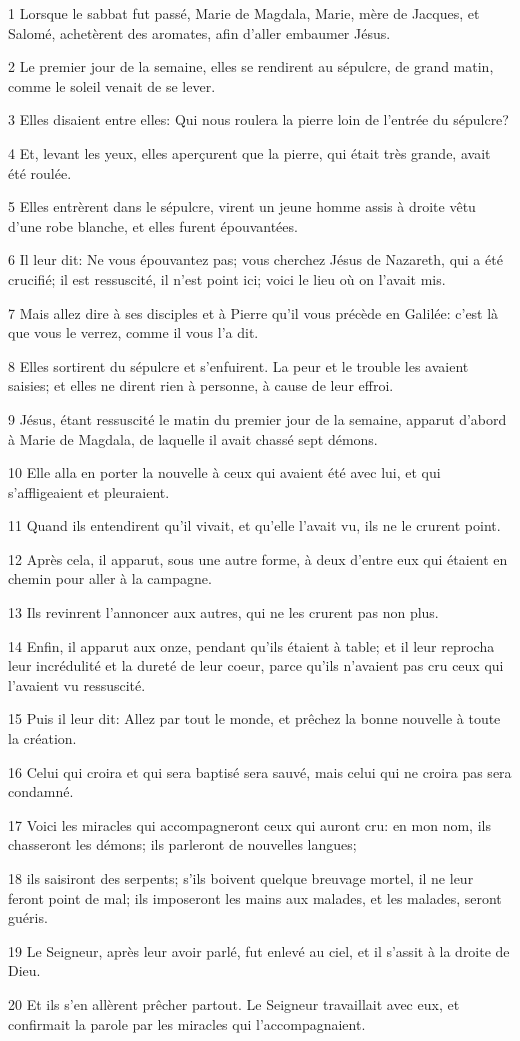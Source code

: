 \par 1 Lorsque le sabbat fut passé, Marie de Magdala, Marie, mère de Jacques, et Salomé, achetèrent des aromates, afin d'aller embaumer Jésus.
\par 2 Le premier jour de la semaine, elles se rendirent au sépulcre, de grand matin, comme le soleil venait de se lever.
\par 3 Elles disaient entre elles: Qui nous roulera la pierre loin de l'entrée du sépulcre?
\par 4 Et, levant les yeux, elles aperçurent que la pierre, qui était très grande, avait été roulée.
\par 5 Elles entrèrent dans le sépulcre, virent un jeune homme assis à droite vêtu d'une robe blanche, et elles furent épouvantées.
\par 6 Il leur dit: Ne vous épouvantez pas; vous cherchez Jésus de Nazareth, qui a été crucifié; il est ressuscité, il n'est point ici; voici le lieu où on l'avait mis.
\par 7 Mais allez dire à ses disciples et à Pierre qu'il vous précède en Galilée: c'est là que vous le verrez, comme il vous l'a dit.
\par 8 Elles sortirent du sépulcre et s'enfuirent. La peur et le trouble les avaient saisies; et elles ne dirent rien à personne, à cause de leur effroi.
\par 9 Jésus, étant ressuscité le matin du premier jour de la semaine, apparut d'abord à Marie de Magdala, de laquelle il avait chassé sept démons.
\par 10 Elle alla en porter la nouvelle à ceux qui avaient été avec lui, et qui s'affligeaient et pleuraient.
\par 11 Quand ils entendirent qu'il vivait, et qu'elle l'avait vu, ils ne le crurent point.
\par 12 Après cela, il apparut, sous une autre forme, à deux d'entre eux qui étaient en chemin pour aller à la campagne.
\par 13 Ils revinrent l'annoncer aux autres, qui ne les crurent pas non plus.
\par 14 Enfin, il apparut aux onze, pendant qu'ils étaient à table; et il leur reprocha leur incrédulité et la dureté de leur coeur, parce qu'ils n'avaient pas cru ceux qui l'avaient vu ressuscité.
\par 15 Puis il leur dit: Allez par tout le monde, et prêchez la bonne nouvelle à toute la création.
\par 16 Celui qui croira et qui sera baptisé sera sauvé, mais celui qui ne croira pas sera condamné.
\par 17 Voici les miracles qui accompagneront ceux qui auront cru: en mon nom, ils chasseront les démons; ils parleront de nouvelles langues;
\par 18 ils saisiront des serpents; s'ils boivent quelque breuvage mortel, il ne leur feront point de mal; ils imposeront les mains aux malades, et les malades, seront guéris.
\par 19 Le Seigneur, après leur avoir parlé, fut enlevé au ciel, et il s'assit à la droite de Dieu.
\par 20 Et ils s'en allèrent prêcher partout. Le Seigneur travaillait avec eux, et confirmait la parole par les miracles qui l'accompagnaient.


